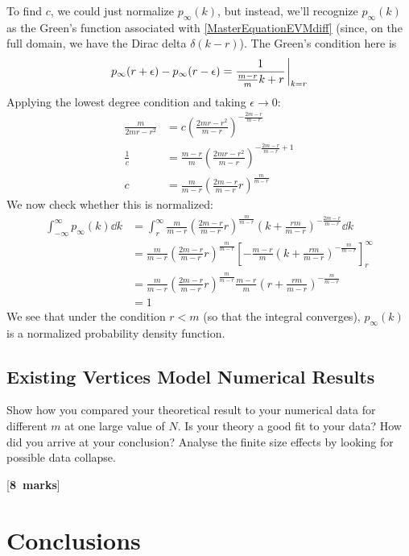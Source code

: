 \documentclass[a4paper,12pt]{article}
\newcounter{nmarks}
\newcommand{\qmarks}[1]{\addtocounter{nmarks}{#1} }
\renewcommand{\qmarks}[1]{\addtocounter{nmarks}{#1} \hspace*{\fill} [\textbf{#1~marks}]}
\begin{document}
To find $c$, we could just normalize $p_\infty(k)$, but instead, we'll recognize $p_\infty(k)$ as the Green's function associated with \ref{MasterEquationEVMdiff} (since, on the full domain, we have the Dirac delta $\delta(k-r)$). The Green's condition here is
$$p_\infty(r+\epsilon)-p_\infty(r-\epsilon)=\frac{1}{\frac{m-r}{m}k+r}\eval_{k=r}$$
Applying the lowest degree condition and taking $\epsilon\to 0$:
\begin{align*}
\frac{m}{2mr-r^2}&=c\left(\frac{2mr-r^2}{m-r}\right)^{-\frac{2m-r}{m-r}}\\
\frac{1}{c}&=\frac{m-r}{m}\left(\frac{2mr-r^2}{m-r}\right)^{-\frac{2m-r}{m-r}+1}\\
c&=\frac{m}{m-r}\left(\frac{2m-r}{m-r}r\right)^{\frac{m}{m-r}}
\end{align*}
We now check whether this is normalized:
\begin{align*}
\int_{-\infty}^\infty p_\infty(k)\dd{k}&= \int_{r}^\infty \frac{m}{m-r}\left(\frac{2m-r}{m-r}r\right)^{\frac{m}{m-r}} \left(k+\frac{rm}{m-r}\right)^{-\frac{2m-r}{m-r}} \dd{k}\\
&= \frac{m}{m-r}\left(\frac{2m-r}{m-r}r\right)^{\frac{m}{m-r}} \left[-\frac{m-r}{m}\left(k+\frac{rm}{m-r}\right)^{-\frac{m}{m-r}}\right]_r^\infty\\
&= \frac{m}{m-r}\left(\frac{2m-r}{m-r}r\right)^{\frac{m}{m-r}} \frac{m-r}{m}\left(r+\frac{rm}{m-r}\right)^{-\frac{m}{m-r}}\\
&= 1
\end{align*}
We see that under the condition $r<m$ (so that the integral converges), $p_\infty(k)$ is a normalized probability density function.

\subsection{Existing Vertices Model Numerical Results}

Show how you compared your theoretical result to your numerical data for different $m$ at one large value of $N$.  Is your theory a good fit to your data? How did you arrive at your conclusion?  
Analyse the finite size effects by looking for possible data collapse. 
\qmarks{8}

\section{Conclusions}\label{sconcl}
\end{document}
